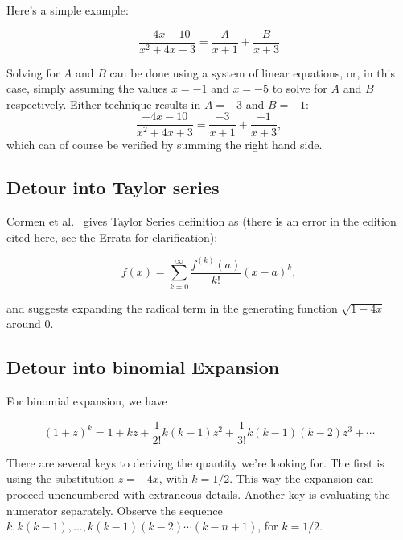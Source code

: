 \documentclass{article}
\begin{document}
Here's a simple example:

\begin{equation}
\frac{-4x-10}{x^2+4x+3} = \frac{A}{x+1} + \frac{B}{x+3}
\end{equation}

Solving for $A$ and $B$ can be done using a system of linear equations,
or, in this case, simply assuming the values $x = -1$ and $x = -5$
to solve for $A$ and $B$ respectively. Either technique results in $A = -3$ and
$B = -1$:
\begin{equation}
\frac{-4x-10}{x^2+4x+3} = \frac{-3}{x+1} + \frac{-1}{x+3},
\end{equation}
which can of course be verified by summing the right hand side.

\subsection{Detour into Taylor series}


Cormen et al.~\cite[p. 262]{cormen:th:1990} gives Taylor Series definition as
(there is an error in the edition cited here, see the Errata for clarification):

\begin{equation}
f(x) = \sum_{k=0}^{\infty} \frac{f^{(k)}(a)}{k!}(x-a)^k,
\end{equation}

and suggests expanding the radical term in the generating function
$\sqrt{1-4x}$ around $0$.



\subsection{Detour into binomial Expansion}

For binomial expansion, we have

\begin{equation}
  (1 + z)^k = 1 + kz + \frac{1}{2!}k(k - 1)z^2 + \frac{1}{3!}k(k - 1)(k - 2)z^3 + \cdots
\end{equation}

There are several keys to deriving the quantity we're looking for.
The first is using the substitution $z = -4x$, with $k = 1/2$. This way the expansion
can proceed unencumbered with extraneous details. Another key is evaluating the
numerator separately. Observe the sequence $k, k(k-1),\dots, k(k - 1)(k - 2)\cdots(k - n + 1)$,
for $k = 1/2$.
\end{document}

